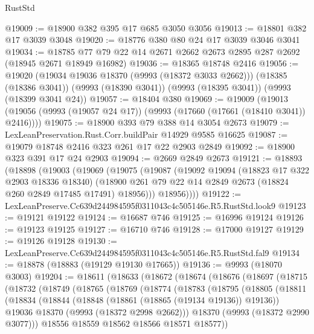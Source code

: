 \begin{lexlean}{RustStd}
\begin{coremodule}
@19009 := @18900 @382 @395 @17 @685 @3050 @3056
@19013 := @18801 @382 @17 @3039 @3048
@19020 := @18776 @380 @80 @24 @17 @3039 @3046 @3041
@19034 := @18785 @77 @79 @22 @14 @2671 @2662 @2673 @2895 @287 @2692 (@18945 @2671 @18949 @16982)
@19036 := @18365 @18748 @2416
@19056 := @19020
    (@19034 @19036 @18370 (@9993 (@18372 @3033 @2662)))
    (@18385 (@18386 @3041))
    (@9993 (@18390 @3041))
    (@9993 (@18395 @3041))
    (@9993 (@18399 @3041 @24))
@19057 := @18404 @380
@19069 := @19009
    (@19013 (@19056 (@9993 (@19057 @24 @17)) (@9993 (@17660 (@17661 (@18410 @3041)) @2416))))
@19075 := @18900 @393 @79 @388 @14 @3054 @2673
@19079 := LexLeanPreservation.Rust.Corr.buildPair @14929 @9585 @16625
@19087 := @19079 @18748 @2416 @323 @261 @17 @22 @2903 @2849
@19092 := @18900 @323 @391 @17 @24 @2903
@19094 := @2669 @2849 @2673
@19121 := @18893
    (@18898
      (@19003
        (@19069
          (@19075
            (@19087
              (@19092
                @19094
                (@18823 @17 @322 @2903 @18336 @18340)
                (@18900 @261 @79 @22 @14 @2849 @2673 (@18824 @260 @2849 @17485 @17491) @18956)))
            @18956))))
@19122 := LexLeanPreserve.Cc639d244984595f0311043c4c505146e.R5.RustStd.look9
@19123 := @19121 @19122
@19124 := @16687 @746
@19125 := @16996 @19124
@19126 := @19123 @19125
@19127 := @16710 @746
@19128 := @17000 @19127
@19129 := @19126 @19128
@19130 := LexLeanPreserve.Cc639d244984595f0311043c4c505146e.R5.RustStd.fal9
@19134 := @18878 (@18883 (@19129 @19130 @17665))
@19136 := @9993 (@18070 @3003)
@19204 := @18611
    (@18633
      (@18672
        (@18674
          (@18676
            (@18697
              (@18715
                (@18732
                  (@18749
                    (@18765
                      (@18769
                        (@18774
                          (@18783
                            (@18795
                              (@18805
                                (@18811
                                  (@18834
                                    (@18844
                                      (@18848 (@18861 (@18865 (@19134 @19136)) @19136))
                                      @19036
                                      @18370
                                      (@9993 (@18372 @2998 @2662)))
                                    @18370
                                    (@9993 (@18372 @2990 @3077)))
                                  @18556
                                  @18559
                                  @18562
                                  @18566
                                  @18571
                                  @18577))

\end{coremodule}
\end{lexlean}
